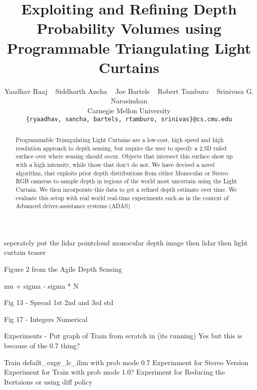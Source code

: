 \documentclass[review]{cvpr}
\begin{document}
\title{Exploiting and Refining Depth Probability Volumes using Programmable Triangulating Light Curtains}

\author{Yaadhav Raaj ~ Siddharth Ancha ~ Joe Bartels ~ Robert Tamburo ~ Srinivasa G. Narasimhan\\
Carnegie Mellon University\\
{\tt\small \{ryaadhav, sancha, bartels, rtamburo, srinivas\}@cs.cmu.edu}
}

\maketitle

\begin{abstract}
Programmable Triangulating Light Curtains are a low-cost, high speed and high resolution approach to depth sensing, but require the user to specify a 2.5D ruled surface over where sensing should occur. Objects that intersect this surface show up with a high intensity, while those that don't do not. We have devised a novel algorithm, that exploits prior depth distributions from either Monocular or Stereo RGB cameras to sample depth in regions of the world most uncertain using the Light Curtain. We then incorporate this data to get a refined depth estimate over time. We evaluate this setup with real world real-time experiments such as in the context of Advanced driver-assistance systems (ADAS)
\end{abstract}

\iffalse
seperately put the lidar pointcloud
monocular depth image
then lidar
then light curtain
teaser

Figure 2 from the Agile Depth Sensing   

mu + sigma - sigma * N

Fig 13 - Spread 1st 2nd and 3rd std

Fig 17 - Integers Numerical

Experiments - Put graph of Train from scratch in (its running)
Yes but this is because of the 0.7 thing?

Train defailt_expy_lc_ilim with prob mode 0.7
Experinment for Stereo Version
Experiment for Train with prob mode 1.0?
Experiment for Reducing the Itertaions or using diff policy
\end{document}
